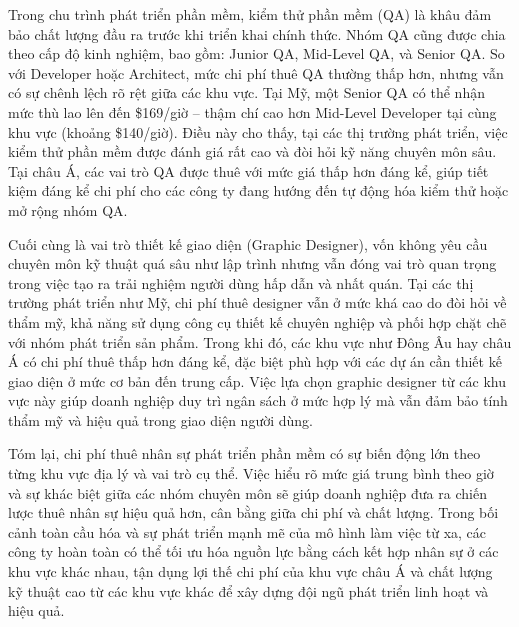    \begin{flushleft}
      \hspace*{0.8cm}Trong chu trình phát triển phần mềm, kiểm thử phần mềm (QA) là khâu đảm bảo chất lượng đầu ra trước khi triển khai chính thức. Nhóm QA cũng được chia theo cấp độ kinh nghiệm, bao gồm: Junior QA, Mid-Level QA, và Senior QA. So với Developer hoặc Architect, mức chi phí thuê QA thường thấp hơn, nhưng vẫn có sự chênh lệch rõ rệt giữa các khu vực. Tại Mỹ, một Senior QA có thể nhận mức thù lao lên đến \$169/giờ – thậm chí cao hơn Mid-Level Developer tại cùng khu vực (khoảng \$140/giờ). Điều này cho thấy, tại các thị trường phát triển, việc kiểm thử phần mềm được đánh giá rất cao và đòi hỏi kỹ năng chuyên môn sâu. Tại châu Á, các vai trò QA được thuê với mức giá thấp hơn đáng kể, giúp tiết kiệm đáng kể chi phí cho các công ty đang hướng đến tự động hóa kiểm thử hoặc mở rộng nhóm QA.
    \end{flushleft}

    \begin{flushleft}
      \hspace*{0.8cm}Cuối cùng là vai trò thiết kế giao diện (Graphic Designer), vốn không yêu cầu chuyên môn kỹ thuật quá sâu như lập trình nhưng vẫn đóng vai trò quan trọng trong việc tạo ra trải nghiệm người dùng hấp dẫn và nhất quán. Tại các thị trường phát triển như Mỹ, chi phí thuê designer vẫn ở mức khá cao do đòi hỏi về thẩm mỹ, khả năng sử dụng công cụ thiết kế chuyên nghiệp và phối hợp chặt chẽ với nhóm phát triển sản phẩm. Trong khi đó, các khu vực như Đông Âu hay châu Á có chi phí thuê thấp hơn đáng kể, đặc biệt phù hợp với các dự án cần thiết kế giao diện ở mức cơ bản đến trung cấp. Việc lựa chọn graphic designer từ các khu vực này giúp doanh nghiệp duy trì ngân sách ở mức hợp lý mà vẫn đảm bảo tính thẩm mỹ và hiệu quả trong giao diện người dùng.
    \end{flushleft}

    \begin{flushleft}
      \hspace*{0.8cm}Tóm lại, chi phí thuê nhân sự phát triển phần mềm có sự biến động lớn theo từng khu vực địa lý và vai trò cụ thể. Việc hiểu rõ mức giá trung bình theo giờ và sự khác biệt giữa các nhóm chuyên môn sẽ giúp doanh nghiệp đưa ra chiến lược thuê nhân sự hiệu quả hơn, cân bằng giữa chi phí và chất lượng. Trong bối cảnh toàn cầu hóa và sự phát triển mạnh mẽ của mô hình làm việc từ xa, các công ty hoàn toàn có thể tối ưu hóa nguồn lực bằng cách kết hợp nhân sự ở các khu vực khác nhau, tận dụng lợi thế chi phí của khu vực châu Á và chất lượng kỹ thuật cao từ các khu vực khác để xây dựng đội ngũ phát triển linh hoạt và hiệu quả.
    \end{flushleft}